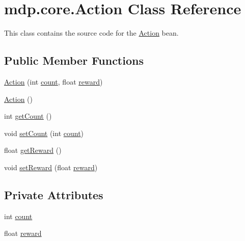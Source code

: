 \hypertarget{classmdp_1_1core_1_1_action}{}\section{mdp.\+core.\+Action Class Reference}
\label{classmdp_1_1core_1_1_action}


This class contains the source code for the \hyperlink{classmdp_1_1core_1_1_action}{Action} bean.  


\subsection*{Public Member Functions}
\begin{DoxyCompactItemize}
\item 
\hyperlink{classmdp_1_1core_1_1_action_a52ceea87b2870ea2dc87caa3c241475a}{Action} (int \hyperlink{classmdp_1_1core_1_1_action_a3fd6370ee73fdac8ec8e84e12f02f261}{count}, float \hyperlink{classmdp_1_1core_1_1_action_a6eb542e734aab31ad3c0af8eb7c6f92f}{reward})
\item 
\hyperlink{classmdp_1_1core_1_1_action_ae776304d635d82a34178963ec012959c}{Action} ()
\item 
int \hyperlink{classmdp_1_1core_1_1_action_a2d864cc0d1815571004f7f4c15e47430}{get\+Count} ()
\item 
void \hyperlink{classmdp_1_1core_1_1_action_a7b61c6ae38dbe01e17a62ee965c5eba0}{set\+Count} (int \hyperlink{classmdp_1_1core_1_1_action_a3fd6370ee73fdac8ec8e84e12f02f261}{count})
\item 
float \hyperlink{classmdp_1_1core_1_1_action_a867d1be997c0e7452a555911f0dfabd4}{get\+Reward} ()
\item 
void \hyperlink{classmdp_1_1core_1_1_action_a32a1af29ce7ea67f2776ffc9c17cb56b}{set\+Reward} (float \hyperlink{classmdp_1_1core_1_1_action_a6eb542e734aab31ad3c0af8eb7c6f92f}{reward})
\end{DoxyCompactItemize}
\subsection*{Private Attributes}
\begin{DoxyCompactItemize}
\item 
int \hyperlink{classmdp_1_1core_1_1_action_a3fd6370ee73fdac8ec8e84e12f02f261}{count}
\item 
float \hyperlink{classmdp_1_1core_1_1_action_a6eb542e734aab31ad3c0af8eb7c6f92f}{reward}
\end{DoxyCompactItemize}



